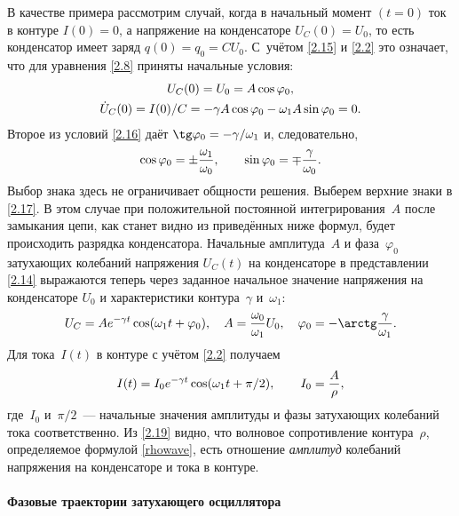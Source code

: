 В качестве примера 
рассмотрим случай, когда в начальный момент $(t=0)$ ток в
контуре $I(0)=0$, а напряжение на конденсаторе $U_C(0)=U_0$, то есть
конденсатор имеет заряд $q(0)=q_0=CU_0$. С~учётом \eqref{2.15} и \eqref{2.2}
это означает, что для уравнения \eqref{2.8} приняты начальные условия:
\begin{equation}
	\eqmark{2.16}
		\begin{gathered}[c]
			U_C(0)=U_0=A \cos\varphi_0, \\
			\dot{U}_C(0)=I(0)/C=-\gamma
A \cos\varphi_0-\omega_1A \sin\varphi_0=0.
		\end{gathered}
\end{equation}
Второе из условий \eqref{2.16} даёт $\tg\varphi_0=-\gamma/\omega_1$
и, следовательно,
\begin{equation}\eqmark{2.17}
\cos\varphi_0=\pm\frac{\omega_1}{\omega_0}, \qquad 
\sin\varphi_0=\mp\frac{\gamma}{\omega_0}.
\end{equation}
Выбор знака здесь не ограничивает общности решения. Выберем верхние знаки в
\eqref{2.17}. В этом случае при положительной постоянной интегрирования~$A$
после замыкания цепи, как станет видно из приведённых ниже формул, будет
происходить разрядка конденсатора. Начальные амплитуда~$A$ и фаза~$\varphi_0$
затухающих колебаний напряжения $U_C(t)$ на конденсаторе в представлении
\eqref{2.14} выражаются теперь через заданное начальное значение напряжения на
конденсаторе $U_0$ и характеристики контура~$\gamma$ и~$\omega_1$:
\begin{equation}\eqmark{2.18}
U_C=A e^{-\gamma t}\cos(\omega_1t+\varphi_0), \quad
A =\frac{\omega_0}{\omega_1}U_0, \quad 
\varphi_0=-\arctg \frac{\gamma}{\omega_1}.
\end{equation}
Для тока~$I(t)$ в контуре с учётом \eqref{2.2} получаем 
\begin{equation}\eqmark{2.19}
I(t)=I_0 e^{-\gamma t}\cos(\omega_1t+\pi/2), \qquad I_0=\frac{A}{\rho},
\end{equation}
где~$I_0$ и~$\pi/2$~--- начальные значения амплитуды и фазы
затухающих колебаний тока соответственно.
Из \eqref{2.19} видно, что волновое сопротивление контура~$\rho$, 
определяемое формулой \eqref{rhowave},
есть отношение \emph{амплитуд} колебаний напряжения на конденсаторе и тока
 в контуре.

\paragraph{Фазовые траектории затухающего осциллятора}

